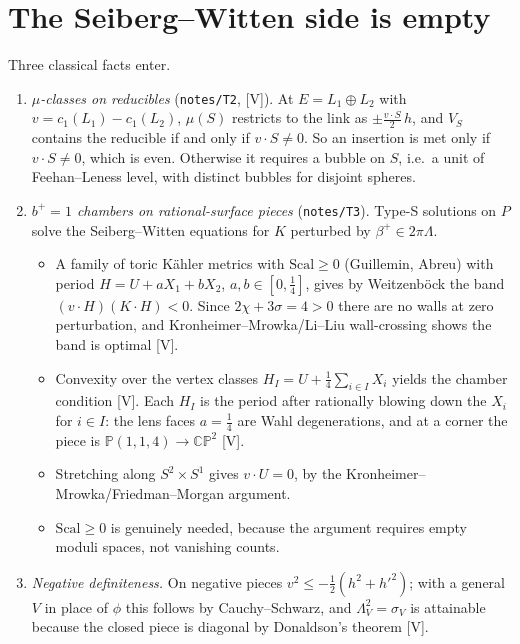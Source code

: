 \documentclass[10pt]{amsart}
\theoremstyle{definition}\newtheorem{definition}[theorem]{Definition}\newtheorem{remark}[theorem]{Remark}
\newcommand{\CP}{\mathbb{CP}}\newcommand{\CPb}{\overline{\mathbb{CP}}{}^2}
\newcommand{\V}{\textsf{[V]}}\newcommand{\Pl}{\textsf{[P]}}\newcommand{\Sp}{\textsf{[S]}}
\begin{document}
\section{The Seiberg--Witten side is empty}
Three classical facts enter.
\begin{enumerate}
\item \emph{$\mu$-classes on reducibles} (\texttt{notes/T2}, \V). At $E=L_1\oplus L_2$ with $v=c_1(L_1)-c_1(L_2)$, $\mu(S)$ restricts to the link as $\pm\tfrac{v\cdot S}{2}\,h$, and $V_S$ contains the reducible if and only if $v\cdot S\neq0$. So an insertion is met only if $v\cdot S\ne0$, which is even. Otherwise it requires a bubble on $S$, i.e.\ a unit of Feehan--Leness level, with distinct bubbles for disjoint spheres.
\item \emph{$b^+=1$ chambers on rational-surface pieces} (\texttt{notes/T3}). Type-S solutions on $P$ solve the Seiberg--Witten equations for $K$ perturbed by $\beta^+\in 2\pi\Lambda$.
\begin{itemize}
\item A family of toric K\"ahler metrics with $\mathrm{Scal}\ge0$ (Guillemin, Abreu) with period $H=U+aX_1+bX_2$, $a,b\in[0,\tfrac14]$, gives by Weitzenb\"ock the band $(v\cdot H)(K\cdot H)<0$. Since $2\chi+3\sigma=4>0$ there are no walls at zero perturbation, and Kronheimer--Mrowka/Li--Liu wall-crossing shows the band is optimal \V.
\item Convexity over the vertex classes $H_I=U+\tfrac14\sum_{i\in I}X_i$ yields the chamber condition \V. Each $H_I$ is the period after rationally blowing down the $X_i$ for $i\in I$: the lens faces $a=\tfrac14$ are Wahl degenerations, and at a corner the piece is $\mathbb P(1,1,4)\to\CP^2$ \V.
\item Stretching along $S^2\times S^1$ gives $v\cdot U=0$, by the Kronheimer--Mrowka/Friedman--Morgan argument.
\item $\mathrm{Scal}\ge0$ is genuinely needed, because the argument requires empty moduli spaces, not vanishing counts.
\end{itemize}
\item \emph{Negative definiteness.} On negative pieces $v^2\le-\tfrac12(h^2+h'^2)$; with a general $V$ in place of $\phi$ this follows by Cauchy--Schwarz, and $\Lambda_V^2=\sigma_V$ is attainable because the closed piece is diagonal by Donaldson's theorem \V.
\end{enumerate}
\end{document}
